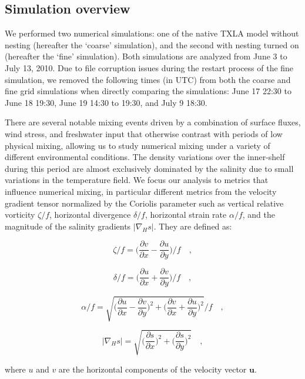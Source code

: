 \documentclass[draft]{agujournal2019}
\begin{document}
\subsection{Simulation overview}

We performed two numerical simulations: one of the native TXLA model without nesting (hereafter the `coarse' simulation), and the second with nesting turned on (hereafter the `fine' simulation). Both simulations are analyzed from June 3 to July 13, 2010. Due to file corruption issues during the restart process of the fine simulation, we removed the following times (in UTC) from both the coarse and fine grid simulations when directly comparing the simulations: June 17 22:30 to June 18 19:30, June 19 14:30 to 19:30, and July 9 18:30. 

There are several notable mixing events driven by a combination of surface fluxes, wind stress, and freshwater input that otherwise contrast with periods of low physical mixing, allowing us to study numerical mixing under a variety of different environmental conditions. The density variations over the inner-shelf during this period are almost exclusively dominated by the salinity due to small variations in the temperature field. We focus our analysis to metrics that influence numerical mixing, in particular different metrics from the velocity gradient tensor normalized by the Coriolis parameter such as vertical relative vorticity $\zeta/f$, horizontal divergence $\delta/f$, horizontal strain rate $\alpha/f$, and the magnitude of the salinity gradients $|\nabla_H s|$. They are defined as:
\begin{linenomath*}
\begin{equation}
    \zeta/f = \bigg(\frac{\partial v}{\partial x} - \frac{\partial u}{\partial y}\bigg)/f \quad ,
\end{equation}
\end{linenomath*}
\begin{linenomath*}
\begin{equation}
    \delta/f = \bigg(\frac{\partial u}{\partial x} + \frac{\partial v}{\partial y}\bigg)/f \quad ,
\end{equation}
\end{linenomath*}
\begin{linenomath*}
\begin{equation}
    \alpha/f = \sqrt{\bigg(\frac{\partial u}{\partial x} - \frac{\partial v}{\partial y}\bigg)^2+\bigg(\frac{\partial v}{\partial x} + \frac{\partial u}{\partial y}\bigg)^2}/f \quad ,
\end{equation}
\end{linenomath*}
\begin{linenomath*}
\begin{equation}
    |\nabla_H s| = \sqrt{\bigg(\frac{\partial s}{\partial x} \bigg) ^2 + \bigg(\frac{\partial s}{\partial y} \bigg)^2} \quad ,
\end{equation}
\end{linenomath*}
where $u$ and $v$ are the horizontal components of the velocity vector $\mathbf{u}$. 
\end{document}
